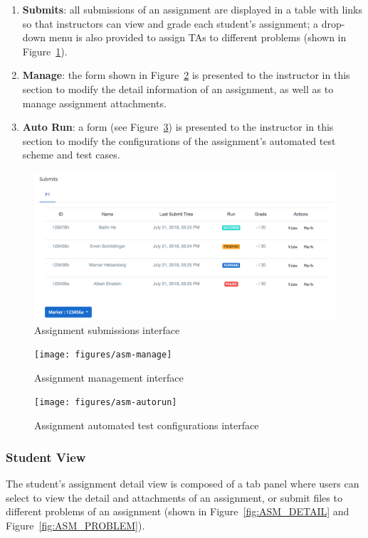 \begin{enumerate}
    \item \textbf{Submits}: all submissions of an assignment are displayed
        in a table with links so that instructors can view and grade each
        student's assignment; a drop-down menu is also provided to assign TAs
        to different problems (shown in Figure~\ref{fig:ASM_SUBMITS}).
    \item \textbf{Manage}: the form shown in Figure~\ref{fig:ASM_MANAGE} is
        presented to the instructor in this section
        to modify the detail information of an assignment, as well as to
        manage assignment attachments.
    \item \textbf{Auto Run}: a form (see Figure~\ref{fig:ASM_AUTORUN}) is
        presented to the instructor in this
        section to modify the configurations of the assignment's automated
        test scheme and test cases.
\end{enumerate}

\begin{figure}[H]
    \centering
        \includegraphics[width=1.0\textwidth]{figures/asm-submits}
    \caption{Assignment submissions interface}
    \label{fig:ASM_SUBMITS}
\end{figure}

\begin{figure}[H]
    \centering
        \texttt{[image: figures/asm-manage]}
    \caption{Assignment management interface}
    \label{fig:ASM_MANAGE}
\end{figure}

\begin{figure}[H]
    \centering
        \texttt{[image: figures/asm-autorun]}
    \caption{Assignment automated test configurations interface}
    \label{fig:ASM_AUTORUN}
\end{figure}

\subsubsection{Student View}
The student's assignment detail view is composed of a tab panel where users can
select to view the detail and attachments of an assignment, or submit files
to different problems of an assignment (shown in Figure~\ref{fig:ASM_DETAIL}
and Figure~\ref{fig:ASM_PROBLEM}).

